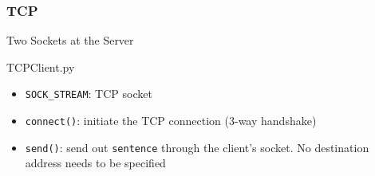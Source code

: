 \subsubsection{TCP}

\begin{frame}
  \begin{block}{Two Sockets at the Server}
    \begin{center}
    \end{center}
  \end{block}
\end{frame}

\begin{frame}{TCPClient.py}
  \begin{center}
  \end{center}
  \begin{itemize}
  \item \texttt{SOCK\_STREAM}: TCP socket
  \item \texttt{connect()}: initiate the TCP connection (3-way handshake)
  \item \texttt{send()}: send out \texttt{sentence} through the client's socket. No
    destination address needs to be specified
  \end{itemize}
\end{frame}

